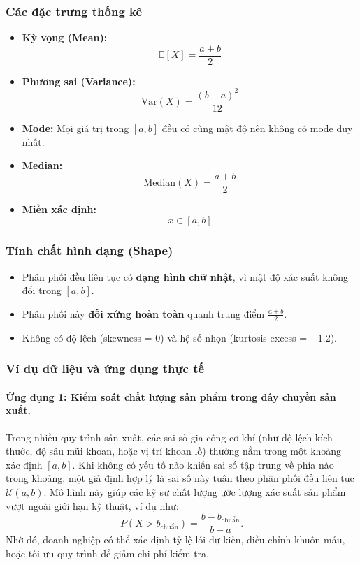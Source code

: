 \documentclass[a4paper,12pt]{article}
\begin{document}
\subsubsection{Các đặc trưng thống kê}

\begin{itemize}
    \item \textbf{Kỳ vọng (Mean):}
    \[
    \mathbb{E}[X] = \frac{a + b}{2}
    \]
    \item \textbf{Phương sai (Variance):}
    \[
    \mathrm{Var}(X) = \frac{(b - a)^2}{12}
    \]
    \item \textbf{Mode:} Mọi giá trị trong $[a, b]$ đều có cùng mật độ nên không có mode duy nhất.
    \item \textbf{Median:}
    \[
    \mathrm{Median}(X) = \frac{a + b}{2}
    \]
    \item \textbf{Miền xác định:}
    \[
    x \in [a, b]
    \]
\end{itemize}

\subsubsection{Tính chất hình dạng (Shape)}

\begin{itemize}
    \item Phân phối đều liên tục có \textbf{dạng hình chữ nhật}, vì mật độ xác suất không đổi trong $[a, b]$.
    \item Phân phối này \textbf{đối xứng hoàn toàn} quanh trung điểm $\frac{a + b}{2}$.
    \item Không có độ lệch (skewness = 0) và hệ số nhọn (kurtosis excess = $-1.2$).
\end{itemize}

\subsubsection{Ví dụ dữ liệu và ứng dụng thực tế}

\paragraph{Ứng dụng 1: Kiểm soát chất lượng sản phẩm trong dây chuyền sản xuất.} 
Trong nhiều quy trình sản xuất, các sai số gia công cơ khí (như độ lệch kích thước, độ sâu mũi khoan, hoặc vị trí khoan lỗ) thường nằm trong một khoảng xác định \([a, b]\). Khi không có yếu tố nào khiến sai số tập trung về phía nào trong khoảng, một giả định hợp lý là sai số này tuân theo phân phối đều liên tục \(\mathcal{U}(a, b)\). 
Mô hình này giúp các kỹ sư chất lượng ước lượng xác suất sản phẩm vượt ngoài giới hạn kỹ thuật, ví dụ như:
\[
P(X > b_{\text{chuẩn}}) = \frac{b - b_{\text{chuẩn}}}{b - a}.
\]
Nhờ đó, doanh nghiệp có thể xác định tỷ lệ lỗi dự kiến, điều chỉnh khuôn mẫu, hoặc tối ưu quy trình để giảm chi phí kiểm tra.
\end{document}
